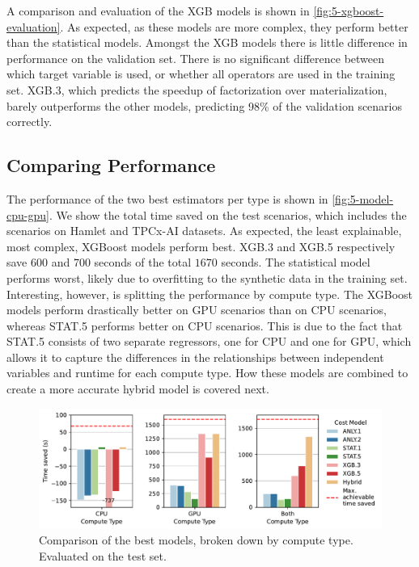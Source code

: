A comparison and evaluation of the XGB models is shown in \autoref{fig:5-xgboost-evaluation}. As expected, as these models are more complex, they perform better than the statistical models. Amongst the XGB models there is little difference in performance on the validation set. There is no significant difference between which target variable is used, or whether all operators are used in the training set. XGB.3, which predicts the speedup of factorization over materialization, barely outperforms the other models, predicting 98\% of the validation scenarios correctly.

\subsection{Comparing Performance}
\label{subsec:5-comparing-performance}
The performance of the two best estimators per type is shown in \autoref{fig:5-model-cpu-gpu}. We show the total time saved on the test scenarios, which includes the scenarios on Hamlet and TPCx-AI datasets. As expected, the least explainable, most complex, XGBoost models perform best. XGB.3 and XGB.5 respectively save $600$ and $700$ seconds of the total $1670$ seconds. The statistical model performs worst, likely due to overfitting to the synthetic data in the training set. Interesting, however, is splitting the performance by compute type. The XGBoost models perform drastically better on GPU scenarios than on CPU scenarios, whereas STAT.5 performs better on CPU scenarios. This is due to the fact that STAT.5 consists of two separate regressors, one for CPU and one for GPU, which allows it to capture the differences in the relationships between independent variables and runtime for each compute type. How these models are combined to create a more accurate hybrid model is covered next.

\begin{figure}[ht]
    \centering
    \includegraphics[width=0.9\linewidth]{chapters/05_cost_estimation/figures/compare_gpu_vs_cpu.pdf}
    \caption[Cost Model Comparison Broken Down by Compute Type]{Comparison of the best models, broken down by compute type. Evaluated on the test set.}
    \label{fig:5-model-cpu-gpu}
\end{figure}


